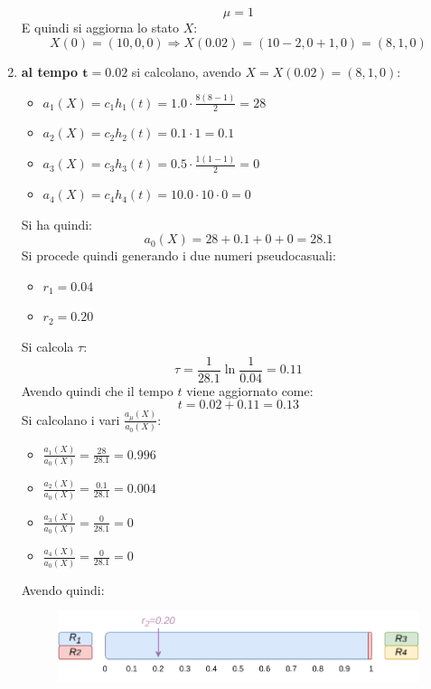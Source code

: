 \documentclass{article}
\begin{document}
\begin{enumerate}[label=\roman*)]
  \[\mu=1\]
  E quindi si aggiorna lo stato $X$:
  \[X(0) = (10,0,0) \Rightarrow X(0.02) = (10-2,0+1,0) = (8,1,0)\]
  \newpage
  \item \textbf{al tempo $\mathbf{t=0.02}$} si calcolano, avendo
  $X=X(0.02)=(8,1,0)$: 
  \begin{multicols}{2}
    \begin{itemize}
      \item $a_1(X)=c_1h_1(t)=1.0\cdot\frac{8(8-1)}{2}=28$
      \item $a_2(X)=c_2h_2(t)=0.1\cdot 1=0.1$
      \item $a_3(X)=c_3h_3(t)=0.5\cdot \frac{1(1-1)}{2}=0$
      \item $a_4(X)=c_4h_4(t)=10.0\cdot 10 \cdot 0=0$
    \end{itemize}
  \end{multicols}
  Si ha quindi:
  \[a_0(X)=28+0.1+0+0=28.1\]
  Si procede quindi generando i due numeri pseudocasuali:
  \begin{multicols}{2}
    \begin{itemize}
      \item $r_1=0.04$
      \item $r_2=0.20$
    \end{itemize}
  \end{multicols}
  Si calcola $\tau$:
  \[\tau=\frac{1}{28.1}\ln\frac{1}{0.04}=0.11\]
  Avendo quindi che il tempo $t$ viene aggiornato come:
  \[t=0.02+0.11=0.13\]
  Si calcolano i vari $\frac{a_\mu(X)}{a_0(X)}$:
  \begin{multicols}{2}
    \begin{itemize}
      \item $\frac{a_1(X)}{a_0(X)}=\frac{28}{28.1}=0.996$
      \item $\frac{a_2(X)}{a_0(X)}=\frac{0.1}{28.1}=0.004$
      \item $\frac{a_3(X)}{a_0(X)}=\frac{0}{28.1}=0$
      \item $\frac{a_4(X)}{a_0(X)}=\frac{0}{28.1}=0$
    \end{itemize}
  \end{multicols}
  Avendo quindi:
  \begin{figure}[H]
    \centering
    \includegraphics[scale = 0.8]{img/t2.pdf}
  \end{figure}

\end{enumerate}
\end{document}
